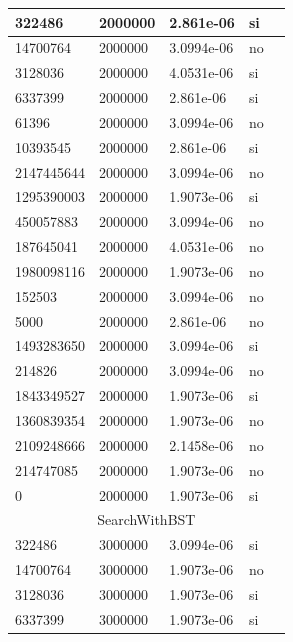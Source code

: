 \documentclass[12pt, fleqn]{article}                             %
\theoremstyle{break}                                            %
\begin{document}
\begin{longtable}{|m{5em}|m{5em}|m{10em}|m{5em}|@{}m{0pt}@{}}
            322486& 2000000  & 2.861e-06 & si &\\[1em]    \hline
            14700764& 2000000  & 3.0994e-06 & no &\\[1em]    \hline
            3128036& 2000000  & 4.0531e-06 & si &\\[1em]    \hline
            6337399& 2000000  & 2.861e-06 & si &\\[1em]    \hline
            61396& 2000000  & 3.0994e-06 & no &\\[1em]    \hline
            10393545& 2000000  & 2.861e-06 & si &\\[1em]    \hline
            2147445644& 2000000  & 3.0994e-06 & no &\\[1em]    \hline
            1295390003& 2000000  & 1.9073e-06 & si &\\[1em]    \hline
            450057883& 2000000  & 3.0994e-06 & no &\\[1em]    \hline
            187645041& 2000000  & 4.0531e-06 & no &\\[1em]    \hline
            1980098116& 2000000  & 1.9073e-06 & no &\\[1em]    \hline
            152503& 2000000  & 3.0994e-06 & no &\\[1em]    \hline
            5000& 2000000  & 2.861e-06 & no &\\[1em]    \hline
            1493283650& 2000000  & 3.0994e-06 & si &\\[1em]    \hline
            214826& 2000000  & 3.0994e-06 & no &\\[1em]    \hline
            1843349527& 2000000  & 1.9073e-06 & si &\\[1em]    \hline
            1360839354& 2000000  & 1.9073e-06 & no &\\[1em]    \hline
            2109248666& 2000000  & 2.1458e-06 & no &\\[1em]    \hline
            214747085& 2000000  & 1.9073e-06 & no &\\[1em]    \hline
            0& 2000000  & 1.9073e-06 & si &\\[1em]    \hline
            \multicolumn{5}{|c|}{SearchWithBST}   \\          \hline
            322486& 3000000  & 3.0994e-06 & si &\\[1em]    \hline
            14700764& 3000000  & 1.9073e-06 & no &\\[1em]    \hline
            3128036& 3000000  & 1.9073e-06 & si &\\[1em]    \hline
            6337399& 3000000  & 1.9073e-06 & si &\\[1em]    \hline

\end{longtable}
\end{document}
